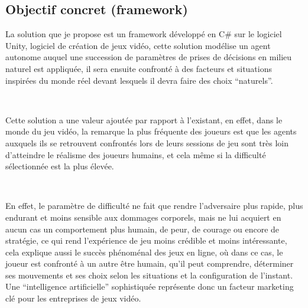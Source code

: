 \subsection{Objectif concret (framework)}

La solution que je propose est un framework développé en C\# sur le logiciel Unity, logiciel de création de jeux vidéo, cette solution modélise un agent autonome auquel une succession de paramètres de prises de décisions en milieu naturel est appliquée, il sera ensuite confronté à des facteurs et situations inspirées du monde réel devant lesquels il devra faire des choix “naturels”.

~\par
Cette solution a une valeur ajoutée par rapport à l'existant, en effet, dans le monde du jeu vidéo, la remarque la plus fréquente des joueurs est que les agents auxquels ils se retrouvent confrontés lors de leurs sessions de jeu sont très loin d’atteindre le réalisme des joueurs humains, et cela même si la difficulté sélectionnée est la plus élevée.

~\par
En effet, le paramètre de difficulté ne fait que rendre l’adversaire plus rapide, plus endurant et moins sensible aux dommages corporels,  mais ne lui acquiert en aucun cas un comportement plus humain, de peur, de courage ou encore de stratégie, ce qui rend l'expérience de jeu moins crédible et moins intéressante, cela explique aussi le succès phénoménal des jeux en ligne, où dans ce cas, le joueur est confronté à un autre être humain, qu’il peut comprendre, déterminer ses mouvements et ses choix selon les situations et la configuration de l’instant. Une “intelligence artificielle” sophistiquée représente donc un facteur marketing clé pour les entreprises de jeux vidéo. 

